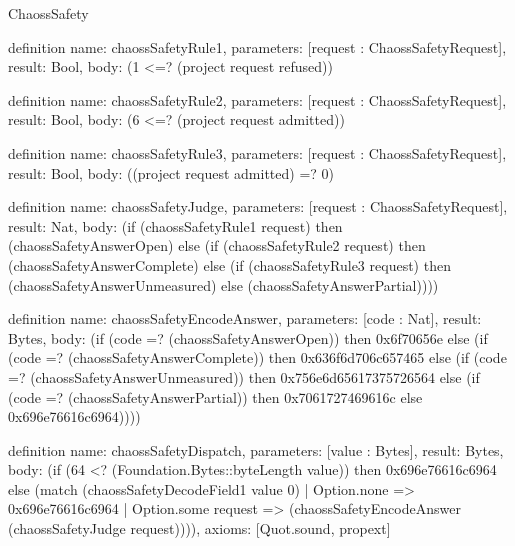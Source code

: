 \begin{lexlean}{ChaossSafety}
\begin{semanticmodule}
definition{
  name: chaossSafetyRule1,
  parameters: [request : ChaossSafetyRequest],
  result: Bool,
  body: (1 <=? (project request refused))
}

definition{
  name: chaossSafetyRule2,
  parameters: [request : ChaossSafetyRequest],
  result: Bool,
  body: (6 <=? (project request admitted))
}

definition{
  name: chaossSafetyRule3,
  parameters: [request : ChaossSafetyRequest],
  result: Bool,
  body: ((project request admitted) =? 0)
}

definition{
  name: chaossSafetyJudge,
  parameters: [request : ChaossSafetyRequest],
  result: Nat,
  body: (if (chaossSafetyRule1 request) then (chaossSafetyAnswerOpen) else (if (chaossSafetyRule2 request) then (chaossSafetyAnswerComplete) else (if (chaossSafetyRule3 request) then (chaossSafetyAnswerUnmeasured) else (chaossSafetyAnswerPartial))))
}

definition{
  name: chaossSafetyEncodeAnswer,
  parameters: [code : Nat],
  result: Bytes,
  body: (if (code =? (chaossSafetyAnswerOpen)) then 0x6f70656e else (if (code =? (chaossSafetyAnswerComplete)) then 0x636f6d706c657465 else (if (code =? (chaossSafetyAnswerUnmeasured)) then 0x756e6d65617375726564 else (if (code =? (chaossSafetyAnswerPartial)) then 0x7061727469616c else 0x696e76616c6964))))
}

definition{
  name: chaossSafetyDispatch,
  parameters: [value : Bytes],
  result: Bytes,
  body: (if (64 <? (Foundation.Bytes::byteLength value)) then 0x696e76616c6964 else (match (chaossSafetyDecodeField1 value 0)
    | Option.none => 0x696e76616c6964
    | Option.some request => (chaossSafetyEncodeAnswer (chaossSafetyJudge request)))),
  axioms: [Quot.sound, propext]
}
\end{semanticmodule}
\end{lexlean}

